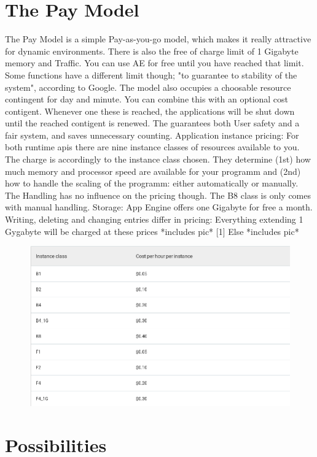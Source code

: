 \documentclass{article}
\begin{document}
\section{The Pay Model}
The Pay Model is a simple Pay-as-you-go model, which makes it really attractive for dynamic environments. There is also the free of charge limit of 1 Gigabyte memory and Traffic. You can use AE for free until you have reached that limit. Some functions have a different limit though; "to guarantee to stability of the system", according to Google. 
The model also occupies a choosable resource contingent for day and minute. You can combine this with an optional cost contigent. Whenever one these is reached, the applications will be shut down until the reached contigent is renewed. The guarantees both User safety and a fair system, and saves unnecessary counting.
Application instance pricing:
For both runtime apis there are nine instance classes of resources available to you. The charge is accordingly to the instance class chosen.
They determine  (1st) how much memory and processor speed are available for your programm and (2nd) how to handle the scaling of the programm: either automatically or manually. 
The Handling has no influence on the pricing though. 
The B8 class is only comes with manual handling.
Storage: App Engine offers one Gigabyte for free a month. Writing, deleting and changing entries differ in pricing: 
Everything extending 1 Gygabyte will be charged at these prices *includes pic* [1]
Else *includes pic*\\
\begin{figure}
	\centering
	\includegraphics[width=0.7\linewidth]{"Screenshot from 2019-11-30 17-46-06"}
	\caption{}
	\label{fig:screenshot-from-2019-11-30-17-46-06}
\end{figure}




\section{Possibilities}
\end{document}

